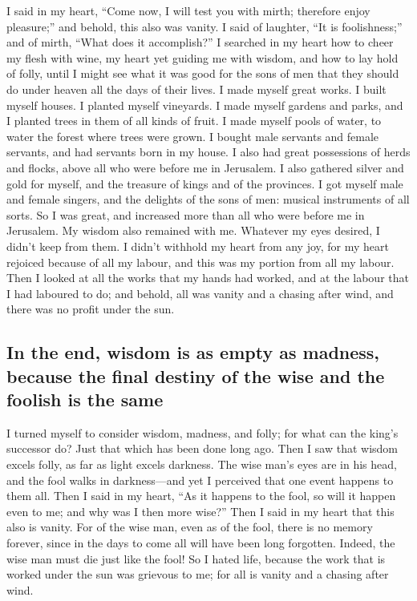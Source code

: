  I said in my heart, ``Come now, I will test you with
mirth; therefore enjoy pleasure;'' and behold, this also was vanity.
 I said of laughter, ``It is foolishness;'' and of mirth,
``What does it accomplish?''  I searched in my heart how
to cheer my flesh with wine, my heart yet guiding me with wisdom, and
how to lay hold of folly, until I might see what it was good for the
sons of men that they should do under heaven all the days of their
lives.  I made myself great works. I built myself houses.
I planted myself vineyards.  I made myself gardens and
parks, and I planted trees in them of all kinds of fruit. 
I made myself pools of water, to water the forest where trees were
grown.  I bought male servants and female servants, and
had servants born in my house. I also had great possessions of herds and
flocks, above all who were before me in Jerusalem.  I also
gathered silver and gold for myself, and the treasure of kings and of
the provinces. I got myself male and female singers, and the delights of
the sons of men: musical instruments of all sorts.  So I
was great, and increased more than all who were before me in Jerusalem.
My wisdom also remained with me.  Whatever my eyes
desired, I didn't keep from them. I didn't withhold my heart from any
joy, for my heart rejoiced because of all my labour, and this was my
portion from all my labour.  Then I looked at all the
works that my hands had worked, and at the labour that I had laboured to
do; and behold, all was vanity and a chasing after wind, and there was
no profit under the sun.

\hypertarget{in-the-end-wisdom-is-as-empty-as-madness-because-the-final-destiny-of-the-wise-and-the-foolish-is-the-same}{%
\subsection{In the end, wisdom is as empty as madness, because the final
destiny of the wise and the foolish is the
same}\label{in-the-end-wisdom-is-as-empty-as-madness-because-the-final-destiny-of-the-wise-and-the-foolish-is-the-same}}

 I turned myself to consider wisdom, madness, and folly;
for what can the king's successor do? Just that which has been done long
ago.  Then I saw that wisdom excels folly, as far as
light excels darkness.  The wise man's eyes are in his
head, and the fool walks in darkness---and yet I perceived that one
event happens to them all.  Then I said in my heart, ``As
it happens to the fool, so will it happen even to me; and why was I then
more wise?'' Then I said in my heart that this also is vanity.
 For of the wise man, even as of the fool, there is no
memory forever, since in the days to come all will have been long
forgotten. Indeed, the wise man must die just like the fool!
 So I hated life, because the work that is worked under
the sun was grievous to me; for all is vanity and a chasing after wind.

